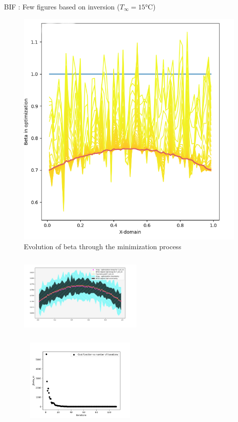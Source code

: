 \documentclass[10pt,
			   xcolor=svgnames,
			   hyperref={linkcolor=red, citecolor = DarkGreen, colorlinks=true, urlcolor=Navy}]{beamer}
\begin{document}
\begin{frame}{BIF : Few figures based on inversion ($T_\infty = \ang{15}$C)}
\begin{multicols}{2}
\noindent
	\begin{figure}[H]
	\centering
	\includegraphics[scale=0.25]{Pres_Evolution_beta_map.png}
	\caption{Evolution of beta through the minimization process}
	\end{figure}

\columnbreak
	
	\vspace*{-1cm}
	\begin{figure}[H]
	\centering
	\includegraphics[height=4cm, width=6cm]{Pres_T_15_Full_Beta_Comp.png}
	\end{figure}
	
	\vspace*{-2.5cm}
	\begin{figure}[H]
	\centering
	\includegraphics[height=4cm, width=6cm]{Evolution_de_l'erreur_T_inf_15.png}
	\end{figure}		



\end{multicols}
\end{frame}
\end{document}
